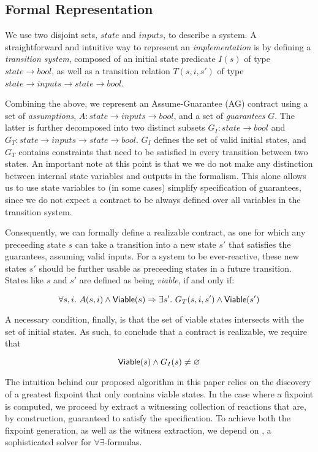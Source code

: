 \subsection{Formal Representation}
\label{sec:formals}
We use two disjoint sets, $state$ and $inputs$, to describe a system.
A straightforward and intuitive way to represent an \emph{implementation} is by
defining a \emph{transition system}, composed of an initial state
predicate $I(s)$ of type $state \to bool$, as well as a transition relation
$T(s,i,s')$ of type $state \to inputs \to state \to bool$.

Combining the above, we represent an Assume-Guarantee (AG) contract using a set
of \emph{assumptions}, $A: state \rightarrow inputs \rightarrow bool$,
and a set of \emph{guarantees} $G$. The latter is further decomposed into two
distinct subsets $G_I: state \rightarrow bool$ and $G_T: state \rightarrow
inputs \rightarrow state \rightarrow bool$. $G_I$ defines the set of valid
initial states, and $G_T$ contains constraints that need to be satisfied in
every transition between two states. An important note at this point is that we
we do not make any distinction between internal state variables and outputs in the
formalism. This alone allows us to use state variables to (in some cases)
simplify specification of guarantees, since we do not expect a contract
to be always defined over all variables in the transition system.

Consequently, we can formally define a realizable contract, as one for which any
preceeding state $s$ can take a transition into a new state $s'$ that satisfies
the guarantees, assuming valid inputs. For a system to be ever-reactive, these
new states $s'$ should be further usable as preceeding states in a future
transition. States like $s$ and $s'$ are defined as being \textit{viable}, if
and only if:

\begin{equation}
\forall s,i.~ A(s, i) \land {\mathsf {Viable}}(s) \Rightarrow \exists s'.~ G_T(s, i,s')
\land {\mathsf {Viable}}(s')
\label{eq:viable}
\end{equation}

A necessary condition, finally, is that the set of viable states
intersects with the set of initial states. As such, to conclude that a contract
is realizable, we require that

\begin{equation}
{\mathsf {Viable}}(s) \land G_I(s) \neq \varnothing
\label{eq:nonempty}
\end{equation}

The intuition behind our proposed algorithm in this paper relies on the
discovery of a greatest fixpoint that only contains viable states. In the case where a fixpoint is computed, we proceed by extract a witnessing collection of reactions that are, by construction, guaranteed to satisfy the specification. To achieve both the fixpoint generation, as well as the witness extraction, we depend on \aeval, a sophisticated solver for $\forall\exists$-formulas.


